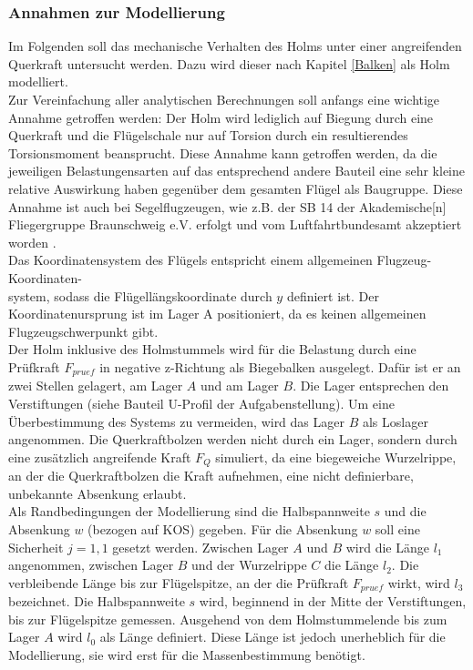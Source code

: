 \subsubsection{Annahmen zur Modellierung}
Im Folgenden soll das mechanische Verhalten des Holms unter einer angreifenden Querkraft untersucht werden. Dazu wird dieser nach Kapitel  \ref{Balken} als Holm modelliert.\\

\noindent Zur Vereinfachung aller analytischen Berechnungen soll anfangs eine wichtige Annahme getroffen werden: Der Holm wird lediglich auf Biegung durch eine Querkraft und die Flügelschale nur auf Torsion durch ein resultierendes Torsionsmoment beansprucht. Diese Annahme kann getroffen werden, da die jeweiligen Belastungensarten auf das entsprechend andere Bauteil eine sehr kleine relative Auswirkung haben gegenüber dem gesamten Flügel als Baugruppe. Diese Annahme ist auch bei Segelflugzeugen, wie z.B. der SB 14 der \glqq Akademische[n] Fliegergruppe Braunschweig e.V.\grqq\: erfolgt und vom Luftfahrtbundesamt akzeptiert worden \cite{item21}.\\

\noindent Das Koordinatensystem des Flügels entspricht einem allgemeinen Flugzeug-Koordinaten-\\system, sodass die Flügellängskoordinate durch $y$ definiert ist. Der Koordinatenursprung ist im Lager A positioniert, da es keinen allgemeinen Flugzeugschwerpunkt gibt. \\

\noindent Der Holm inklusive des Holmstummels wird für die Belastung durch eine Prüfkraft $F_{pruef}$ in negative z-Richtung als Biegebalken ausgelegt. Dafür ist er an zwei Stellen gelagert, am Lager $A$ und am Lager $B$. Die Lager entsprechen den Verstiftungen (siehe Bauteil U-Profil der Aufgabenstellung). Um eine Überbestimmung des Systems zu vermeiden, wird das Lager $B$ als Loslager angenommen. Die Querkraftbolzen werden nicht durch ein Lager, sondern durch eine zusätzlich angreifende Kraft $F_{Q}$ simuliert, da eine biegeweiche Wurzelrippe, an der die Querkraftbolzen die Kraft aufnehmen, eine nicht definierbare, unbekannte Absenkung erlaubt.\\

\noindent Als Randbedingungen der Modellierung sind die Halbspannweite $s$ und die Absenkung $w$ (bezogen auf KOS) gegeben. Für die Absenkung $w$ soll eine Sicherheit $j=1,1$ gesetzt werden. Zwischen Lager $A$ und $B$ wird die Länge $l_{1}$ angenommen, zwischen Lager $B$ und der Wurzelrippe $C$ die Länge $l_{2}$. Die verbleibende Länge bis zur Flügelspitze, an der die Prüfkraft $F_{pruef}$ wirkt, wird $l_{3}$ bezeichnet. Die Halbspannweite $s$ wird, beginnend in der Mitte der Verstiftungen, bis zur Flügelspitze gemessen. Ausgehend von dem Holmstummelende bis zum Lager $A$ wird $l_{0}$ als Länge definiert. Diese Länge ist jedoch unerheblich für die Modellierung, sie wird erst für die Massenbestimmung benötigt.\\

